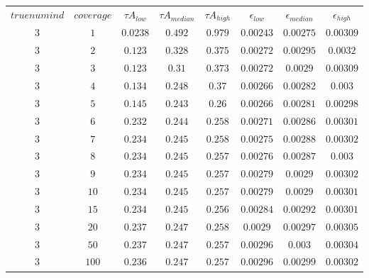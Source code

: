 \begin{table}[H]
\begin{tabular}{cccccccc}
$truenumind$ & $coverage$ & ${\tau}A_{low}$ & ${\tau}A_{median}$ & ${\tau}A_{high}$ & $\epsilon_{low}$ & $\epsilon_{median}$ & $\epsilon_{high}$\\
$3$ & $1$ & $0.0238$ & $0.492$ & $0.979$ & $0.00243$ & $0.00275$ & $0.00309$\\
$3$ & $2$ & $0.123$ & $0.328$ & $0.375$ & $0.00272$ & $0.00295$ & $0.0032$\\
$3$ & $3$ & $0.123$ & $0.31$ & $0.373$ & $0.00272$ & $0.0029$ & $0.00309$\\
$3$ & $4$ & $0.134$ & $0.248$ & $0.37$ & $0.00266$ & $0.00282$ & $0.003$\\
$3$ & $5$ & $0.145$ & $0.243$ & $0.26$ & $0.00266$ & $0.00281$ & $0.00298$\\
$3$ & $6$ & $0.232$ & $0.244$ & $0.258$ & $0.00271$ & $0.00286$ & $0.00301$\\
$3$ & $7$ & $0.234$ & $0.245$ & $0.258$ & $0.00275$ & $0.00288$ & $0.00302$\\
$3$ & $8$ & $0.234$ & $0.245$ & $0.257$ & $0.00276$ & $0.00287$ & $0.003$\\
$3$ & $9$ & $0.234$ & $0.245$ & $0.257$ & $0.00279$ & $0.0029$ & $0.00302$\\
$3$ & $10$ & $0.234$ & $0.245$ & $0.257$ & $0.00279$ & $0.0029$ & $0.00301$\\
$3$ & $15$ & $0.234$ & $0.245$ & $0.256$ & $0.00284$ & $0.00292$ & $0.00301$\\
$3$ & $20$ & $0.237$ & $0.247$ & $0.258$ & $0.0029$ & $0.00297$ & $0.00305$\\
$3$ & $50$ & $0.237$ & $0.247$ & $0.257$ & $0.00296$ & $0.003$ & $0.00304$\\
$3$ & $100$ & $0.236$ & $0.247$ & $0.257$ & $0.00296$ & $0.00299$ & $0.00302$\\
\end{tabular}
\end{table}
 